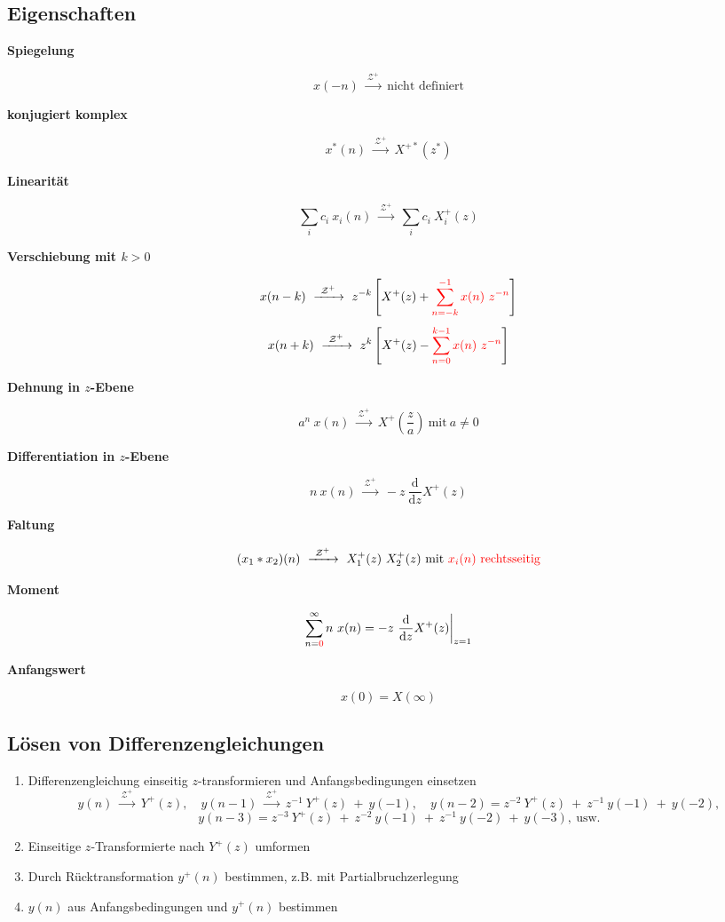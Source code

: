 \documentclass[10pt,a4paper]{article}
\newcommand{\fancyformula}[2]{
	\small\raggedright{\sffamily\textbf{#1}}
	#2
}
\newcommand{\ztransformOneSided}{
	~\xrightarrow{~\mathcal{Z^{+}}~}~
}
\begin{document}
\subsection*{Eigenschaften}
\vspace{-1.5em}
\begin{multicols}{2}
	\fancyformula{Spiegelung}{
 		\[ x(-n) \ztransformOneSided \text{nicht definiert} \]
	}

	\fancyformula{konjugiert komplex}{
		\[ x^{*}(n) \ztransformOneSided X^{+*}(z^{*}) \]
	}

	\fancyformula{Linearität}{
		\[ \sum_i c_i ~ x_i(n) \ztransformOneSided \sum_i c_{i} ~ X^{+}_i(z) \]
	}

	\fancyformula{Verschiebung mit $k > 0$}{
		\[ x(n - k) \ztransformOneSided z^{-k} \left[X^{+}(z) + \textcolor{red}{\sum_{n = -k}^{-1} x(n) ~ z^{-n}}\right] \]
		\[ x(n + k) \ztransformOneSided z^k \left[X^{+}(z) - \textcolor{red}{\sum_{n = 0}^{k-1} x(n) ~ z^{-n}}\right] \]
	}
	\fancyformula{Dehnung in $z$-Ebene}{
		\[ a^n ~ x(n) \ztransformOneSided X^+\left(\frac{z}{a}\right) ~ \text{mit} ~ a \neq 0\]
	}

	\fancyformula{Differentiation in $z$-Ebene}{
		\[ n ~ x(n)\ztransformOneSided -z ~ \frac{\mathrm d}{\mathrm dz} X^+(z) \]
	}

	\fancyformula{Faltung}{
		\[ (x_1 * x_2)(n) \ztransformOneSided X_1^+(z) ~ X_2^+(z) ~ \text{mit \textcolor{red}{$x_{i}(n)$ rechtsseitig}} \]
	}

	\fancyformula{Moment}{
		\[ \sum_{n = \textcolor{red}{0}}^{\infty} n ~ x(n) = -z ~ \frac{\mathrm d}{\mathrm dz} X^{+}(z) \bigg |_{z = 1} \]
	}

	\fancyformula{Anfangswert}{
	\[x(0)=X(\infty)\]
	}
\end{multicols}
\subsection*{Lösen von Differenzengleichungen}
\begin{enumerate}
	\item Differenzengleichung einseitig $z$-transformieren und Anfangsbedingungen einsetzen
	\[
		y(n) \ztransformOneSided Y^+(z), \quad y(n - 1) \ztransformOneSided z^{-1} ~ Y^+(z) ~ + ~ y(-1), \quad y(n - 2) = z^{-2} ~ Y^+(z) ~ + ~ z^{-1} ~ y(-1) ~ + ~ y(-2),
	\]
	\[
		y(n - 3) = z^{-3} ~ Y^+(z) ~ + ~ z^{-2} ~ y(-1) ~ + ~ z^{-1} ~ y(-2) ~ + ~ y(-3), ~ \text{usw.}
	\]
	\item Einseitige $z$-Transformierte nach $Y^+(z)$ umformen
	\item Durch Rücktransformation $y^+(n)$ bestimmen, z.B. mit Partialbruchzerlegung
	\item  $y(n)$ aus Anfangsbedingungen und $y^+(n)$  bestimmen
\end{enumerate}
\end{document}
